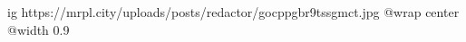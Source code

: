  
 
 
 
 

\ifcmt
  ig https://mrpl.city/uploads/posts/redactor/gocppgbr9tssgmct.jpg
  @wrap center
  @width 0.9
\fi
